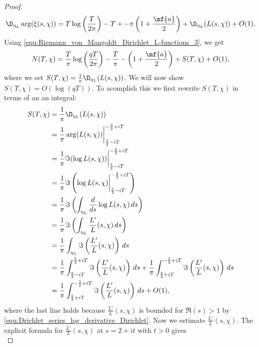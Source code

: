 \begin{proof}
        \[
          \D_{\eta_{L}}\arg(\xi(s,\chi)) = T\log\left(\frac{T}{2\pi}\right)-T+-\pi\left(1+\frac{\mf{a}}{2}\right)+\D_{\eta_{L}}(L(s,\chi))+O(1).
        \]
        Using \cref{equ:Riemann_von_Mangoldt_Dirichlet_L-functions_3}, we get
        \begin{equation}\label{equ:Riemann_von_Mangoldt_Dirichlet_L-functions_7}
          N(T,\chi) = \frac{T}{\pi}\log\left(\frac{qT}{2\pi}\right)-\frac{T}{\pi}-\left(1+\frac{\mf{a}}{2}\right)+S(T,\chi)+O(1),
        \end{equation}
        where we set $S(T,\chi) = \frac{1}{\pi}\D_{\eta_{L}}(L(s,\chi))$. We will now show $S(T,\chi) = O(\log(qT))$. To acomplish this we first rewrite $S(T,\chi)$ in terms of an  an integral:
        \begin{equation}\label{equ:Riemann_von_Mangoldt_Dirichlet_L-functions_8}
          \begin{aligned}
            S(T,\chi) &= \frac{1}{\pi}\D_{\eta_{L}}(L(s,\chi)) \\
            &= \frac{1}{\pi}\arg(L(s,\chi))\bigg|_{\frac{5}{2}-iT}^{-\frac{3}{2}+iT} \\
            &= \frac{1}{\pi}\Im(\log L(s,\chi))\bigg|_{\frac{5}{2}-iT}^{-\frac{3}{2}+iT} \\
            &= \frac{1}{\pi}\Im\left(\log L(s,\chi)\bigg|_{\frac{5}{2}-iT}^{-\frac{3}{2}+iT}\right) \\
            &= \frac{1}{\pi}\Im\left(\int_{\eta_{L}}\frac{d}{ds}\log L(s,\chi)\,ds\right) \\
            &= \frac{1}{\pi}\Im\left(\int_{\eta_{L}}\frac{L'}{L}(s,\chi)\,ds\right) \\
            &= \frac{1}{\pi}\int_{\eta_{L}}\Im\left(\frac{L'}{L}(s,\chi)\right)\,ds \\
            &= \frac{1}{\pi}\int_{\frac{5}{2}-iT}^{\frac{5}{2}+iT}\Im\left(\frac{L'}{L}(s,\chi)\right)\,ds+\frac{1}{\pi}\int_{\frac{5}{2}+iT}^{-\frac{3}{2}+iT}\Im\left(\frac{L'}{L}(s,\chi)\right)\,ds \\
            &= \frac{1}{\pi}\int_{\frac{5}{2}+iT}^{-\frac{3}{2}+iT}\Im\left(\frac{L'}{L}(s,\chi)\right)\,ds+O(1),
          \end{aligned}
        \end{equation}
        where the last line holds because $\frac{L'}{L}(s,\chi)$ is bounded for $\Re(s) > 1$ by \cref{equ:Drichlet_series_log_derivative_Dirichlet}. Now we estimate $\frac{L'}{L}(s,\chi)$. The explicit formula for $\frac{L'}{L}(s,\chi)$ at $s = 2+it$ with $t > 0$ gives
        \begin{equation}\label{equ:Riemann_von_Mangoldt_Dirichlet_L-functions_9}

\end{equation}
\end{proof}
